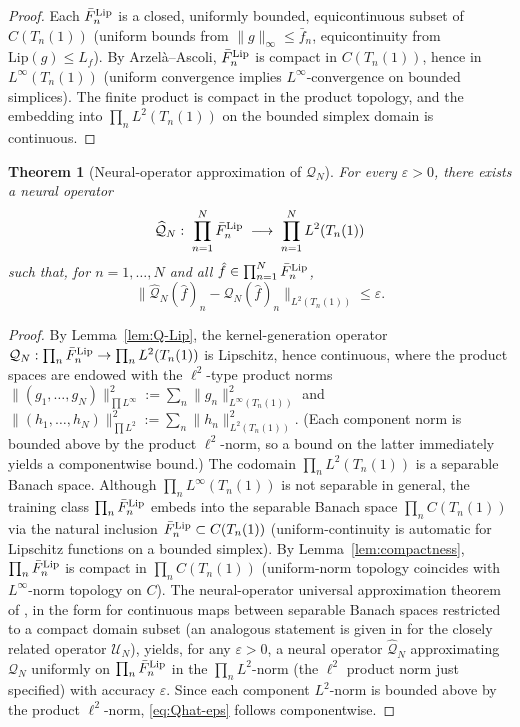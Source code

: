 \documentclass[journal,twoside,web]{ieeecolor}
\newtheorem{theorem}{Theorem}
\begin{document}
\begin{proof}
Each $\bar F_n^{\rm Lip}$ is a closed, uniformly bounded, equicontinuous subset of $C(T_n(1))$ (uniform bounds from $\|g\|_\infty\le \bar f_n$, equicontinuity from $\mathrm{Lip}(g)\le L_f$). By Arzel\`a--Ascoli, $\bar F_n^{\rm Lip}$ is compact in $C(T_n(1))$, hence in $L^\infty(T_n(1))$ (uniform convergence implies $L^\infty$-convergence on bounded simplices). The finite product is compact in the product topology, and the embedding into $\prod_n L^2(T_n(1))$ on the bounded simplex domain is continuous.
\end{proof}

\begin{theorem}[Neural-operator approximation of $\mathcal Q_N$]\label{thm:NO-approx}
For every $\varepsilon>0$, there exists a neural operator
\begin{equation}\label{eq:Qhat-def}
\widehat{\mathcal Q}_N:\;\prod_{n=1}^N \bar F_n^{\rm Lip}\;\longrightarrow\;\prod_{n=1}^N L^2(T_n(1))
\end{equation}
such that, for $n=1,\ldots,N$ and all $\hat f\in\prod_{n=1}^N \bar F_n^{\rm Lip}$,
\begin{equation}\label{eq:Qhat-eps}
\|\widehat{\mathcal Q}_N(\hat f)_n-\mathcal Q_N(\hat f)_n\|_{L^2(T_n(1))}\le \varepsilon.
\end{equation}
\end{theorem}

\begin{proof}
By Lemma~\ref{lem:Q-Lip}, the kernel-generation operator $\mathcal Q_N:\prod_n \bar F_n^{\rm Lip}\to\prod_n L^2(T_n(1))$ is Lipschitz, hence continuous, where the product spaces are endowed with the $\ell^2$-type product norms $\|(g_1,\ldots,g_N)\|_{\prod L^\infty}^2:=\sum_n\|g_n\|_{L^\infty(T_n(1))}^2$ and $\|(h_1,\ldots,h_N)\|_{\prod L^2}^2:=\sum_n\|h_n\|_{L^2(T_n(1))}^2$. (Each component norm is bounded above by the product $\ell^2$-norm, so a bound on the latter immediately yields a componentwise bound.) The codomain $\prod_n L^2(T_n(1))$ is a separable Banach space. Although $\prod_n L^\infty(T_n(1))$ is not separable in general, the training class $\prod_n \bar F_n^{\rm Lip}$ embeds into the separable Banach space $\prod_n C(T_n(1))$ via the natural inclusion $\bar F_n^{\rm Lip}\subset C(T_n(1))$ (uniform-continuity is automatic for Lipschitz functions on a bounded simplex). By Lemma~\ref{lem:compactness}, $\prod_n \bar F_n^{\rm Lip}$ is compact in $\prod_n C(T_n(1))$ (uniform-norm topology coincides with $L^\infty$-norm topology on $C$). The neural-operator universal approximation theorem of \cite{Lu2021Universal}, in the form for continuous maps between separable Banach spaces restricted to a compact domain subset (an analogous statement is given in \cite{HV3} for the closely related operator $\mathcal U_N$), yields, for any $\varepsilon>0$, a neural operator $\widehat{\mathcal Q}_N$ approximating $\mathcal Q_N$ uniformly on $\prod_n \bar F_n^{\rm Lip}$ in the $\prod_n L^2$-norm (the $\ell^2$ product norm just specified) with accuracy $\varepsilon$. Since each component $L^2$-norm is bounded above by the product $\ell^2$-norm, \eqref{eq:Qhat-eps} follows componentwise.
\end{proof}
\end{document}
